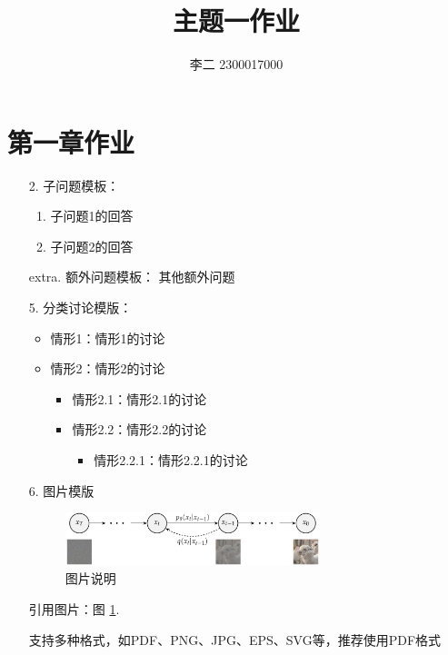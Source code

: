 \documentclass{ctexart}
\title{\bfseries 主题一作业}
\author{李二 2300017000}
\begin{document}
\maketitle

\section{第一章作业}


\begin{enumerate}[wide, labelindent=0pt]
\item[2.] 子问题模板：
\begin{enumerate}
\item 子问题1的回答
\item 子问题2的回答
\end{enumerate}

\item[extra.] 额外问题模板：
其他额外问题

\item[5.] 分类讨论模版：
\begin{itemize}
    \item 情形1：情形1的讨论
    \item 情形2：情形2的讨论
    \begin{itemize}
        \item 情形2.1：情形2.1的讨论
        \item 情形2.2：情形2.2的讨论
        \begin{itemize}
            \item 情形2.2.1：情形2.2.1的讨论
        \end{itemize}
    \end{itemize}
\end{itemize}

\item[6.] 图片模版
\begin{figure}[ht]
    \centering
    \includegraphics[width=0.7\textwidth]{example-image-a.pdf}
    \caption{图片说明}\label{fig:example}
\end{figure}
引用图片：图 \ref{fig:example}. 

支持多种格式，如PDF、PNG、JPG、EPS、SVG等，推荐使用PDF格式


\end{enumerate}
\end{document}
